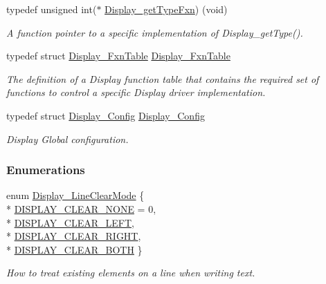 \begin{DoxyCompactItemize}
typedef unsigned int($\ast$ \hyperlink{_display_8h_a2800d49b89aa7e3d9a2ec758d60358f1}{Display\+\_\+get\+Type\+Fxn}) (void)
\begin{DoxyCompactList}\small\item\em A function pointer to a specific implementation of Display\+\_\+get\+Type(). \end{DoxyCompactList}\item 
typedef struct \hyperlink{struct_display___fxn_table}{Display\+\_\+\+Fxn\+Table} \hyperlink{_display_8h_abdb33c07acce5b6e5affae6725331399}{Display\+\_\+\+Fxn\+Table}
\begin{DoxyCompactList}\small\item\em The definition of a Display function table that contains the required set of functions to control a specific Display driver implementation. \end{DoxyCompactList}\item 
typedef struct \hyperlink{struct_display___config}{Display\+\_\+\+Config} \hyperlink{_display_8h_a154de9b84d3b0d30daa9d729d65a6d5c}{Display\+\_\+\+Config}
\begin{DoxyCompactList}\small\item\em Display Global configuration. \end{DoxyCompactList}\end{DoxyCompactItemize}
\subsubsection*{Enumerations}
\begin{DoxyCompactItemize}
\item 
enum \hyperlink{_display_8h_a3d9ab99875c344491227a76f1d47e377}{Display\+\_\+\+Line\+Clear\+Mode} \{ \\*
\hyperlink{_display_8h_a3d9ab99875c344491227a76f1d47e377a8f60ab659badd77a0591a5357cfe5f54}{D\+I\+S\+P\+L\+A\+Y\+\_\+\+C\+L\+E\+A\+R\+\_\+\+N\+O\+N\+E} = 0, 
\\*
\hyperlink{_display_8h_a3d9ab99875c344491227a76f1d47e377aabdeba4f8c5781eaff441a3778e6cc74}{D\+I\+S\+P\+L\+A\+Y\+\_\+\+C\+L\+E\+A\+R\+\_\+\+L\+E\+F\+T}, 
\\*
\hyperlink{_display_8h_a3d9ab99875c344491227a76f1d47e377affc02447ea45e2c3db516a7b211b3b91}{D\+I\+S\+P\+L\+A\+Y\+\_\+\+C\+L\+E\+A\+R\+\_\+\+R\+I\+G\+H\+T}, 
\\*
\hyperlink{_display_8h_a3d9ab99875c344491227a76f1d47e377a14588c1117513fc430c964428f62484e}{D\+I\+S\+P\+L\+A\+Y\+\_\+\+C\+L\+E\+A\+R\+\_\+\+B\+O\+T\+H}
 \}
\begin{DoxyCompactList}\small\item\em How to treat existing elements on a line when writing text. \end{DoxyCompactList}\end{DoxyCompactItemize}
